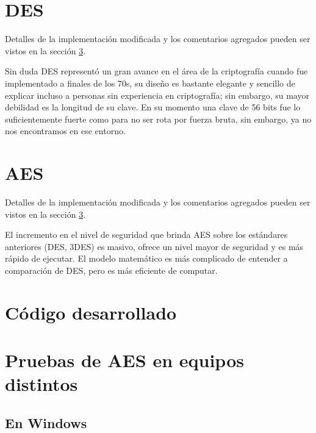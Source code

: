 \documentclass{article}
\begin{document}
    \section{DES}
        
        Detalles de la implementación modificada y los comentarios agregados pueden ser vistos en la sección \ref{sec:code}.

        Sin duda DES representó un gran avance en el área de la criptografía cuando fue implementado a finales de los 70s, su diseño es bastante elegante y sencillo de explicar incluso a personas sin experiencia en criptografía; sin embargo, su mayor debilidad es la longitud de su clave. En su momento una clave de 56 bits fue lo suficientemente fuerte como para no ser rota por fuerza bruta, sin embargo, ya no nos encontramos en ese entorno.

    \section{AES}
        
        Detalles de la implementación modificada y los comentarios agregados pueden ser vistos en la sección \ref{sec:code}.
        
        El incremento en el nivel de seguridad que brinda AES sobre los estándares anteriores (DES, 3DES) es masivo, ofrece un nivel mayor de seguridad y es más rápido de ejecutar. El modelo matemático es más complicado de entender a comparación de DES, pero es más eficiente de computar.

    \appendix
    \section{Código desarrollado} \label{sec:code}
        
        

    \section{Pruebas de AES en equipos distintos}

        \subsection{En Windows}
\end{document}
